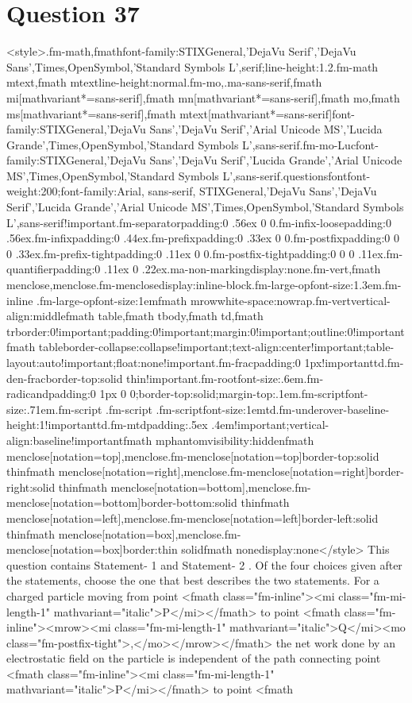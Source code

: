 \documentclass{article}
\begin{document}
\section*{Question 37}
<style>.fm-math,fmath{font-family:STIXGeneral,'DejaVu Serif','DejaVu Sans',Times,OpenSymbol,'Standard Symbols L',serif;line-height:1.2}.fm-math mtext,fmath mtext{line-height:normal}.fm-mo,.ma-sans-serif,fmath mi[mathvariant*=sans-serif],fmath mn[mathvariant*=sans-serif],fmath mo,fmath ms[mathvariant*=sans-serif],fmath mtext[mathvariant*=sans-serif]{font-family:STIXGeneral,'DejaVu Sans','DejaVu Serif','Arial Unicode MS','Lucida Grande',Times,OpenSymbol,'Standard Symbols L',sans-serif}.fm-mo-Luc{font-family:STIXGeneral,'DejaVu Sans','DejaVu Serif','Lucida Grande','Arial Unicode MS',Times,OpenSymbol,'Standard Symbols L',sans-serif}.questionsfont{font-weight:200;font-family:Arial, sans-serif, STIXGeneral,'DejaVu Sans','DejaVu Serif','Lucida Grande','Arial Unicode MS',Times,OpenSymbol,'Standard Symbols L',sans-serif!important}.fm-separator{padding:0 .56ex 0 0}.fm-infix-loose{padding:0 .56ex}.fm-infix{padding:0 .44ex}.fm-prefix{padding:0 .33ex 0 0}.fm-postfix{padding:0 0 0 .33ex}.fm-prefix-tight{padding:0 .11ex 0 0}.fm-postfix-tight{padding:0 0 0 .11ex}.fm-quantifier{padding:0 .11ex 0 .22ex}.ma-non-marking{display:none}.fm-vert,fmath menclose,menclose.fm-menclose{display:inline-block}.fm-large-op{font-size:1.3em}.fm-inline .fm-large-op{font-size:1em}fmath mrow{white-space:nowrap}.fm-vert{vertical-align:middle}fmath table,fmath tbody,fmath td,fmath tr{border:0!important;padding:0!important;margin:0!important;outline:0!important}fmath table{border-collapse:collapse!important;text-align:center!important;table-layout:auto!important;float:none!important}.fm-frac{padding:0 1px!important}td.fm-den-frac{border-top:solid thin!important}.fm-root{font-size:.6em}.fm-radicand{padding:0 1px 0 0;border-top:solid;margin-top:.1em}.fm-script{font-size:.71em}.fm-script .fm-script .fm-script{font-size:1em}td.fm-underover-base{line-height:1!important}td.fm-mtd{padding:.5ex .4em!important;vertical-align:baseline!important}fmath mphantom{visibility:hidden}fmath menclose[notation=top],menclose.fm-menclose[notation=top]{border-top:solid thin}fmath menclose[notation=right],menclose.fm-menclose[notation=right]{border-right:solid thin}fmath menclose[notation=bottom],menclose.fm-menclose[notation=bottom]{border-bottom:solid thin}fmath menclose[notation=left],menclose.fm-menclose[notation=left]{border-left:solid thin}fmath menclose[notation=box],menclose.fm-menclose[notation=box]{border:thin solid}fmath none{display:none}</style> This question contains Statement- 1 and Statement- 2 . Of the four choices given after the statements, choose the one that best describes the two statements. \newline For a charged particle moving from point <fmath class="fm-inline"><mi class="fm-mi-length-1" mathvariant="italic">P</mi></fmath> to point <fmath class="fm-inline"><mrow><mi class="fm-mi-length-1" mathvariant="italic">Q</mi><mo class="fm-postfix-tight">,</mo></mrow></fmath> the net work done by an electrostatic field on the particle is independent of the path connecting point <fmath class="fm-inline"><mi class="fm-mi-length-1" mathvariant="italic">P</mi></fmath> to point <fmath 
\end{document}
